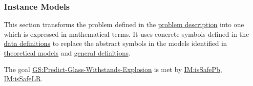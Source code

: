 \documentclass[12pt]{article}
\begin{document}
\subsubsection{Instance Models}
\label{Sec:IMs}
This section transforms the problem defined in the \hyperref[Sec:ProbDesc]{problem description} into one which is expressed in mathematical terms. It uses concrete symbols defined in the \hyperref[Sec:DDs]{data definitions} to replace the abstract symbols in the models identified in \hyperref[Sec:TMs]{theoretical models} and \hyperref[Sec:GDs]{general definitions}.

The goal \hyperref[willBreakGS]{GS:Predict-Glass-Withstands-Explosion} is met by \hyperref[IM:isSafePb]{IM:isSafePb}, \hyperref[IM:isSafeLR]{IM:isSafeLR}.

\vspace{\baselineskip}
\noindent
\end{document}
